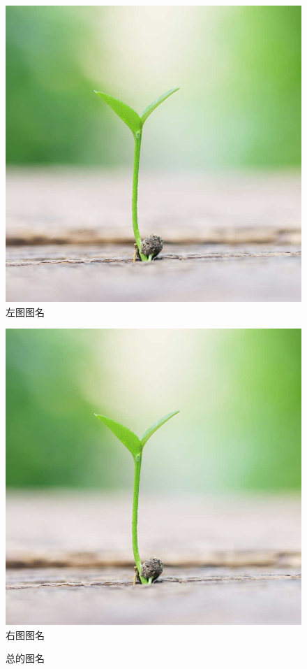 \documentclass[12pt, a4paper, oneside]{ctexart}
\begin{document}
	\begin{figure}[htbp]
		\begin{minipage}[t]{0.5\linewidth}
			\centering
			\includegraphics[width=\textwidth]{LaTeX_article_template.jpg}	%
			\centering 左图图名
		\end{minipage}
		\begin{minipage}[t]{0.5\linewidth}
			\centering
			\includegraphics[width=\textwidth]{LaTeX_article_template.jpg}
			\centering 右图图名
		\end{minipage}
		\caption{总的图名}
		\label{a_label}
	\end{figure}
\end{document}
